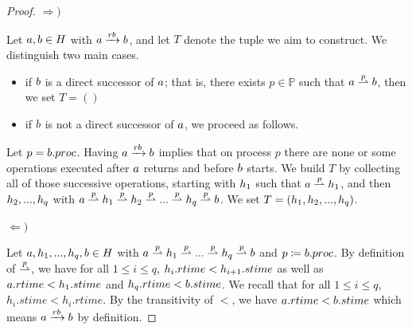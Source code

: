 \documentclass[12pt]{article}
\begin{document}
\begin{proof}
$\Rightarrow)$

Let $a,b \in H$ with $a\xrightarrow{rb}b$, and let $T$ denote the tuple we aim to construct. We distinguish two main cases.
\begin{itemize}[label=$\ast$,itemsep=0pt,parsep=0pt]
	\item if $b$ is a direct successor of $a$; that is, there exists $p \in \mathbb{P}$ such that $a\stackrel{p}{\rightharpoonup}b$, then we set $T=()$
	\item if $b$ is not a direct successor of $a$, we proceed as follows.
\end{itemize}

Let $p=b.proc$. Having $a\xrightarrow{rb}b$ implies that on process $p$ there are none or some operations executed after $a$ returns and before $b$ starts. We build $T$ by collecting all of those successive operations, starting with $h_1$ such that \mbox{$a\stackrel{p}{\rightharpoonup}h_1$}, and then $h_2,...,h_q$ with 
\mbox{$a\stackrel{p}{\rightharpoonup} h_1 \stackrel{p}{\rightharpoonup} h_2 \stackrel{p}{\rightharpoonup} ... \stackrel{p}{\rightharpoonup} h_q \stackrel{p}{\rightharpoonup} b$}. We set $T=(h_1,h_2,...,h_q)$.

$\Leftarrow)$

Let $a,h_1,...,h_q,b \in H$ with 
\mbox{$a \stackrel{p}{\rightharpoonup} h_1 \stackrel{p}{\rightharpoonup} ... \stackrel{p}{\rightharpoonup} h_q \stackrel{p}{\rightharpoonup} b$} and  $p\coloneq b.proc$. By definition of $\stackrel{p}{\rightharpoonup}$, we have for all \mbox{$1 \leq i \leq q$}, $h_i.rtime<h_{i+1}.stime$ as well as \mbox{$a.rtime<h_1.stime$} and \mbox{$h_q.rtime<b.stime$}. We recall that for all \mbox{$1 \leq i \leq q$}, $h_i.stime<h_i.rtime$. By the transitivity of $<$, we have $a.rtime<b.stime$ which means $a \xrightarrow{rb}b$ by definition.

\end{proof}

\vspace{1em}

\end{document}
